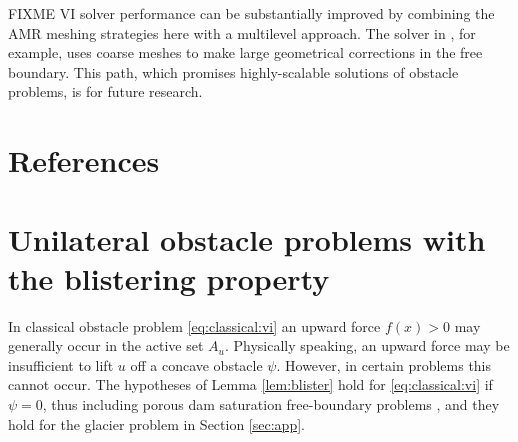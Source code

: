 \documentclass[]{interact}
\theoremstyle{plain}%
\theoremstyle{definition}
\theoremstyle{remark}
\begin{document}
FIXME VI solver performance can be substantially improved by combining the AMR meshing strategies here with a multilevel approach.  The solver in \cite{BuelerFarrell2024}, for example, uses coarse meshes to make large geometrical corrections in the free boundary.  This path, which promises highly-scalable solutions of obstacle problems, is for future research.




\section{References}





\appendix
\section{Unilateral obstacle problems with the blistering property} \label{app:blistering}

In classical obstacle problem \eqref{eq:classical:vi} an upward force $f(x)>0$ may generally occur in the active set $A_u$.  Physically speaking, an upward force may be insufficient to lift $u$ off a concave obstacle $\psi$.  However, in certain problems this cannot occur.  The hypotheses of Lemma \ref{lem:blister} hold for \eqref{eq:classical:vi} if $\psi=0$, thus including porous dam saturation free-boundary problems \cite[for example]{AinsworthOdenLee1993}, and they hold for the glacier problem in Section \ref{sec:app}.
\end{document}
